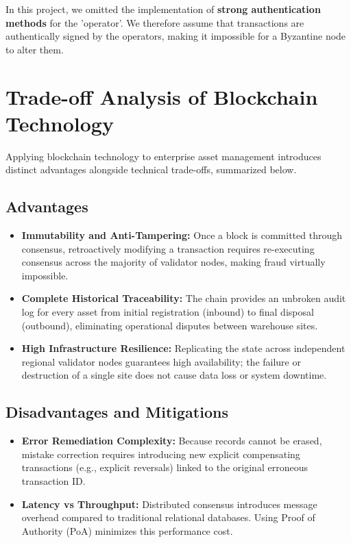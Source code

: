 \documentclass[11pt,a4paper]{memoir}
\begin{document}
In this project, we omitted the implementation of \textbf{strong authentication methods} for the 'operator'. We therefore assume that transactions are authentically signed by the operators, making it impossible for a Byzantine node to alter them. 

\section{Trade-off Analysis of Blockchain Technology}
Applying blockchain technology to enterprise asset management introduces distinct advantages alongside technical trade-offs, summarized below.

\subsection{Advantages}
\begin{itemize}
    \item \textbf{Immutability and Anti-Tampering:} Once a block is committed through consensus, retroactively modifying a transaction requires re-executing consensus across the majority of validator nodes, making fraud virtually impossible.
    \item \textbf{Complete Historical Traceability:} The chain provides an unbroken audit log for every asset from initial registration (inbound) to final disposal (outbound), eliminating operational disputes between warehouse sites.
    \item \textbf{High Infrastructure Resilience:} Replicating the state across independent regional validator nodes guarantees high availability; the failure or destruction of a single site does not cause data loss or system downtime.
\end{itemize}

\subsection{Disadvantages and Mitigations}
\begin{itemize}
    \item \textbf{Error Remediation Complexity:} Because records cannot be erased, mistake correction requires introducing new explicit compensating transactions (e.g., explicit reversals) linked to the original erroneous transaction ID.
    \item \textbf{Latency vs Throughput:} Distributed consensus introduces message overhead compared to traditional relational databases. Using Proof of Authority (PoA) minimizes this performance cost.
\end{itemize}
\end{document}

